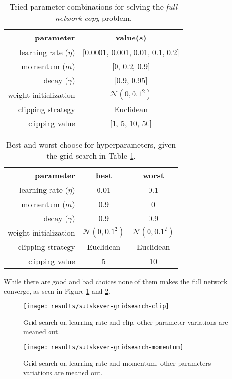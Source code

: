 \begin{table}[h]
\centering
\begin{tabular}{r|c}
	parameter & value(s) \\ \hline
	learning rate ($\eta$) & [0.0001, 0.001, 0.01, 0.1, 0.2] \\
	momentum ($m$) & [0, 0.2, 0.9] \\
	decay ($\gamma$) & [0.9, 0.95] \\
	weight initialization & $\mathcal{N}(0, 0.1^2)$ \\
	clipping strategy & Euclidean \\
	clipping value & [1, 5, 10, 50]
\end{tabular}
\caption{Tried parameter combinations for solving the \textit{full network copy} problem.}
\label{table:resutls:sutskever:gridsearch-range}
\end{table}
\begin{table}[h]
\vspace{-0.5cm}
\centering
\begin{tabular}{r|c|c}
	parameter & best & worst  \\ \hline
	learning rate ($\eta$) & 0.01 & 0.1 \\
	momentum ($m$) & 0.9 & 0 \\
	decay ($\gamma$) & 0.9 & 0.9 \\
	weight initialization & $\mathcal{N}(0, 0.1^2)$ & $\mathcal{N}(0, 0.1^2)$ \\
	clipping strategy & Euclidean & Euclidean \\
	clipping value & 5 & 10
\end{tabular}
\caption{Best and worst choose for hyperparameters, given the grid search in Table \ref{table:resutls:sutskever:gridsearch-range}.}
\end{table}

While there are good and bad choices none of them makes the full network converge, as seen in Figure \ref{fig:results:sutskever:gridsearch-clip} and \ref{fig:results:sutskever:gridsearch-momentum}.
\begin{figure}[h]
	\centering
	\texttt{[image: results/sutskever-gridsearch-clip]}
	\caption{Grid search on learning rate and clip, other parameter variations are meaned out.}
	\label{fig:results:sutskever:gridsearch-clip}
\end{figure}
\begin{figure}[H]
	\centering
	\texttt{[image: results/sutskever-gridsearch-momentum]}
	\caption{Grid search on learning rate and momentum, other parameters variations are meaned out.}
	\label{fig:results:sutskever:gridsearch-momentum}
\end{figure}


